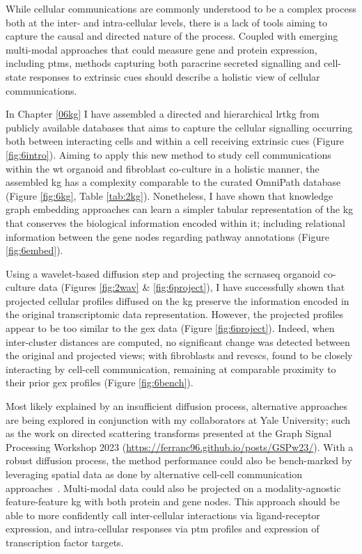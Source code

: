 While cellular communications are commonly understood to be a complex process both at the inter- and intra-cellular levels, there is a lack of tools aiming to capture the causal and directed nature of the process. Coupled with emerging multi-modal approaches that could measure gene and protein expression, including \acrshort{ptm}s, methods capturing both paracrine secreted signalling and cell-state responses to extrinsic cues should describe a holistic view of cellular communications.

In Chapter \ref{06kg} I have assembled a directed and hierarchical \acrfull{lrtkg} from publicly available databases that aims to capture the cellular signalling occurring both between interacting cells and within a cell receiving extrinsic cues (Figure \ref{fig:6intro}). Aiming to apply this new method to study cell communications within the \acrshort{wt} organoid and fibroblast co-culture in a holistic manner, the assembled \acrshort{kg} has a complexity comparable to the curated OmniPath database (Figure \ref{fig:6kg}, Table \ref{tab:2kg}). Nonetheless, I have shown that knowledge graph embedding approaches can learn a simpler tabular representation of the \acrshort{kg} that conserves the biological information encoded within it; including relational information between the gene nodes regarding pathway annotations (Figure \ref{fig:6embed}). 

Using a wavelet-based diffusion step and projecting the \acrshort{scrnaseq} organoid co-culture data (Figures \ref{fig:2wav} \& \ref{fig:6project}), I have successfully shown that projected cellular profiles diffused on the \acrshort{kg} preserve the information encoded in the original transcriptomic data representation. However, the projected profiles appear to be too similar to the \acrfull{gex} data (Figure \ref{fig:6project}). Indeed, when inter-cluster distances are computed, no significant change was detected between the original and projected views; with fibroblasts and \acrshort{revcsc}s, found to be closely interacting by cell-cell communication, remaining at comparable proximity to their prior \acrshort{gex} profiles (Figure \ref{fig:6bench}).

Most likely explained by an insufficient diffusion process, alternative approaches are being explored in conjunction with my collaborators at Yale University; such as the work on directed scattering transforms presented at the Graph Signal Processing Workshop 2023 (\url{https://ferranc96.github.io/posts/GSPw23/}). With a robust diffusion process, the method performance could also be bench-marked by leveraging spatial data as done by alternative cell-cell communication approaches~\cite{fischer_modeling_2022}. Multi-modal data could also be projected on a modality-agnostic feature-feature \acrshort{kg} with both protein and gene nodes. This approach should be able to more confidently call inter-cellular interactions via ligand-receptor expression, and intra-cellular responses via \acrshort{ptm} profiles and expression of transcription factor targets.

